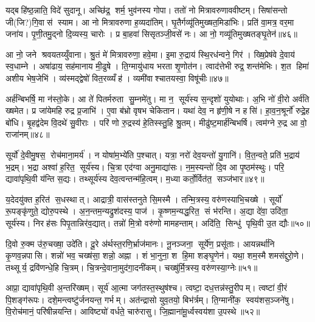 यद्बहि॑ष्ठ॒न्नाति॒ विदे॑ सुदानू। अच्छि॑द्र॒ शर्म॒ भुव॑नस्य गोपा। ततो॑ नो मित्रावरुणाववीष्टम्। सिषा॑सन्तो जी(जि?)गि॒वास॑ स्याम। आ नो मित्रावरुणा ह॒व्यदा॑तिम्। घृ॒तैर्गव्यू॑तिमुख्षत॒मिडा॑भिः। प्रति॑ वा॒मत्र॒ वर॒मा जना॑य। पृ॒णी॒तमु॒द्नो दि॒व्यस्य॒ चारोः। प्र बा॒हवा॑ सिसृतञ्जी॒वसे॑ नः। आ नो॒ गव्यू॑तिमुख्षतङ्घृ॒तेन॑॥४६॥

आ नो॒ जने श्रवयतय्युँवाना। श्रु॒तं मे॑ मित्रावरुणा॒ हवे॒मा। इ॒मा रु॒द्राय॑ स्थि॒रध॑न्वने॒ गिर॑। ख्षि॒प्रेष॑वे दे॒वाय॑ स्व॒धाम्ने। अषा॑ढाय॒ सह॑मानाय मी॒ढुषे। ति॒ग्मायु॑धाय भरता शृ॒णोत॑न। त्वाद॑त्तेभी रुद्र॒ शन्त॑मेभिः। श॒त हिमा॑ अशीय भेष॒जेभि॑। व्य॑स्मद्द्वेषो॑ वित॒रव्व्यँह॑। व्यमी॑वाश्चातयस्वा॒ विषू॑चीः॥४७॥

अर्\mbox{}ह॑न्बिभर्\mbox{}षि॒ मा न॑स्तो॒के। आ ते॑ पितर्मरुता सु॒म्नमे॑तु। मा न॒ सूर्य॑स्य स॒न्दृशो॑ युयोथाः। अ॒भि नो॑ वी॒रो अर्व॑ति ख्षमेत। प्र जा॑येमहि रुद्र प्र॒जाभि॑। ए॒वा ब॑भ्रो वृषभ चेकितान। यथा॑ देव॒ न हृ॑णी॒षे न हसि॑। हा॒व॒न॒श्रूर्नो॑ रुद्रे॒ह बो॑धि। बृ॒हद्व॑देम वि॒दथे॑ सु॒वीराः। परि॑ णो रु॒द्रस्य॑ हे॒तिस्स्तु॒हि श्रु॒तम्। मीढु॑ष्ट॒मार्\mbox{}ह॑न्बिभर्\mbox{}षि। त्वम॑ग्ने रु॒द्र आ वो॒ राजा॑नम्॥४८॥\anuvakamend[वसू॑नि ततानास्तु॒ विश्वान्॑ ववृत्याव्वँवर्ति घृ॒तेन॒ विषू॑चीश्श्रु॒तन्द्वे च॑]

सूर्यो॑ दे॒वीमु॒षस॒ रोच॑माना॒मर्य॑। न योषा॑म॒भ्ये॑ति प॒श्चात्। यत्रा॒ नरो॑ देव॒यन्तो॑ यु॒गानि॑। वि॒त॒न्वते॒ प्रति॑ भ॒द्राय॑ भ॒द्रम्। भ॒द्रा अश्वा॑ ह॒रित॒ सूर्य॑स्य। चि॒त्रा एद॑ग्वा अनु॒माद्या॑सः। न॒म॒स्यन्तो॑ दि॒व आ पृ॒ष्ठम॑स्थुः। परि॒ द्यावा॑पृथि॒वी य॑न्ति स॒द्यः। तथ्सूर्य॑स्य देव॒त्वन्तन्म॑हि॒त्वम्। म॒ध्या कर्तो॒र्वित॑त॒ सञ्ज॑भार॥४९॥

य॒देदयु॑क्त ह॒रित॑ स॒धस्थात्। आद्रात्री॒ वास॑स्तनुते सि॒मस्मै। तन्मि॒त्रस्य॒ वरु॑णस्याभि॒चख्षे। सूर्यो॑ रू॒पङ्कृ॑णुते॒ द्योरु॒पस्थे। अ॒न॒न्तम॒न्यद्रुश॑दस्य॒ पाज॑। कृ॒ष्णम॒न्यद्ध॒रित॒ सं भ॑रन्ति। अ॒द्या दे॑वा॒ उदि॑ता॒ सूर्य॑स्य। निरह॑सः पिपृ॒तान्निर॑व॒द्यात्। तन्नो॑ मि॒त्रो वरु॑णो मामहन्ताम्। अदि॑ति॒ सिन्धु॑ पृथि॒वी उ॒त द्यौः॥५०॥

दि॒वो रु॒क्म उ॑रु॒चख्षा॒ उदे॑ति। दू॒रे अ॑र्थस्त॒रणि॒र्भ्राज॑मानः। नू॒नञ्जना॒ सूर्ये॑ण॒ प्रसू॑ताः। आयन्नर्था॑नि कृ॒णव॒न्नपासि। शन्नो॑ भव॒ चख्ष॑सा॒ शन्नो॒ अह्ना। शं भा॒नुना॒ श हि॒मा शङ्घृ॒णेन॑। यथा॒ शम॒स्मै शमस॑द्दुरो॒णे। तथ्सूर्य॒ द्रवि॑णन्धे॒हि चि॒त्रम्। चि॒त्रन्दे॒वाना॒मुद॑गा॒दनी॑कम्। चख्षु॑र्मि॒त्रस्य॒ वरु॑णस्या॒ग्नेः॥५१॥

आप्रा॒ द्यावा॑पृथि॒वी अ॒न्तरि॑ख्षम्। सूर्य॑ आ॒त्मा जग॑तस्त॒स्थुष॑श्च। त्वष्टा॒ दध॒त्तन्न॑स्तु॒रीपम्। त्वष्टा॑ वी॒रं पि॒शङ्ग॑रूपः। दशे॒मन्त्वष्टु॑र्जनयन्त॒ गर्भम्। अत॑न्द्रासो युव॒तयो॒ बिभ॑र्त्रम्। ति॒ग्मानी॑क॒ स्वय॑शस॒ञ्जने॑षु। वि॒रोच॑मानं॒ परि॑षीन्नयन्ति। आविष्ट्यो॑ वर्धते॒ चारु॑रासु। जि॒ह्माना॑मू॒र्ध्वस्वय॑शा उ॒पस्थे॥५२॥

